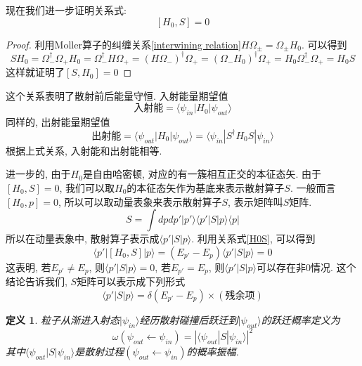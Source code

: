 \documentclass[a4paper,11pt]{book}
\newtheorem{definition}{\hspace{2em}定义}[section]
\newtheorem{proof}{证明}[section]
\begin{document}
现在我们进一步证明关系式:
\begin{equation}\label{H0S}
  [H_0,S]=0
\end{equation}
\begin{proof}
  利用Moller算子的纠缠关系\eqref{interwining relation}$H\Omega_{\pm}=\Omega_{\pm}H_0$. 可以得到
  \begin{equation}
    SH_0=\Omega_-^\dag\Omega_+H_0=\Omega_-^\dag H\Omega_+=(H\Omega_-)^\dag\Omega_+=(\Omega_-H_0)^\dag\Omega_+=H_0\Omega_-^\dag\Omega_+=H_0S
  \end{equation}
  这样就证明了$[S,H_0]=0$
\end{proof}
这个关系表明了散射前后能量守恒. 入射能量期望值
\begin{equation}
  \text{入射能}=\langle\psi_{in}|H_0|\psi_{out}\rangle
\end{equation}
同样的, 出射能量期望值
\begin{equation}
  \text{出射能}=\langle\psi_{out}|H_0|\psi_{out}\rangle=\langle\psi_{in}|S^\dag H_0S|\psi_{in}\rangle
\end{equation}
根据上式关系, 入射能和出射能相等.

进一步的, 由于$H_0$是自由哈密顿, 对应的有一簇相互正交的本征态矢. 由于$[H_0,S]=0$, 我们可以取$H_0$的本征态矢作为基底来表示散射算子$S$. 一般而言$[H_0,p]=0$, 所以可以取动量表象来表示散射算子$S$, 表示矩阵叫$S$矩阵.
\begin{equation}
  S=\int dpdp'|p'\rangle\langle p'|S|p\rangle\langle p|
\end{equation}
所以在动量表象中, 散射算子表示成$\langle p'|S|p\rangle$. 利用关系式\eqref{H0S}, 可以得到
\begin{equation}
  \langle p'|[H_0,S]|p\rangle=(E_{p'}-E_p)\langle p'|S|p\rangle=0
\end{equation}
这表明, 若$E_{p'}\neq E_p$, 则$\langle p'|S|p\rangle=0$, 若$E_{p'}=E_p$, 则$\langle p'|S|p\rangle$可以存在非$0$情况. 这个结论告诉我们, $S$矩阵可以表示成下列形式
\begin{equation}
  \langle p'|S|p\rangle=\delta(E_{p'}-E_p)\times (\text{残余项})
\end{equation}
\begin{definition}
  粒子从渐进入射态$|\psi_{in}\rangle$经历散射碰撞后跃迁到$|\psi_{out}\rangle$的跃迁概率定义为
  \begin{equation}
    \omega(\psi_{out}\leftarrow\psi_{in})=|\langle\psi_{out}|S|\psi_{in}\rangle|^2
  \end{equation}
  其中$\langle\psi_{out}|S|\psi_{in}\rangle$是散射过程$(\psi_{out}\leftarrow\psi_{in})$的概率振幅.
\end{definition}
\end{document}
